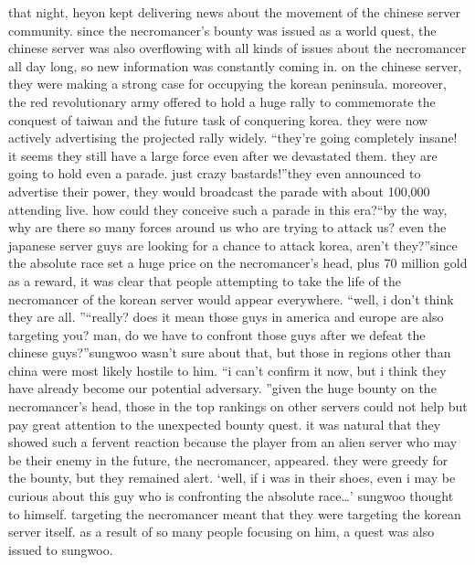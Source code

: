 that night, heyon kept delivering news about the movement of the chinese server community.
 since the necromancer’s bounty was issued as a world quest, the chinese server was also overflowing with all kinds of issues about the necromancer all day long, so new information was constantly coming in.
on the chinese server, they were making a strong case for occupying the korean peninsula.
 moreover, the red revolutionary army offered to hold a huge rally to commemorate the conquest of taiwan and the future task of conquering korea.
 they were now actively advertising the projected rally widely.
“they’re going completely insane! it seems they still have a large force even after we devastated them.
 they are going to hold even a parade.
 just crazy bastards!”they even announced to advertise their power, they would broadcast the parade with about 100,000 attending live.
 how could they conceive such a parade in this era?“by the way, why are there so many forces around us who are trying to attack us? even the japanese server guys are looking for a chance to attack korea, aren’t they?”since the absolute race set a huge price on the necromancer’s head, plus 70 million gold as a reward, it was clear that people attempting to take the life of the necromancer of the korean server would appear everywhere.
“well, i don’t think they are all.
”“really? does it mean those guys in america and europe are also targeting you? man, do we have to confront those guys after we defeat the chinese guys?”sungwoo wasn’t sure about that, but those in regions other than china were most likely hostile to him.
“i can’t confirm it now, but i think they have already become our potential adversary.
”given the huge bounty on the necromancer’s head, those in the top rankings on other servers could not help but pay great attention to the unexpected bounty quest.
it was natural that they showed such a fervent reaction because the player from an alien server who may be their enemy in the future, the necromancer, appeared.
 they were greedy for the bounty, but they remained alert.
‘well, if i was in their shoes, even i may be curious about this guy who is confronting the absolute race…’ sungwoo thought to himself.
targeting the necromancer meant that they were targeting the korean server itself.
as a result of so many people focusing on him, a quest was also issued to sungwoo.

